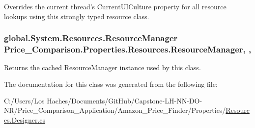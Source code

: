 Overrides the current thread's Current\-U\-I\-Culture property for all resource lookups using this strongly typed resource class. 

\hypertarget{class_price___comparison_1_1_properties_1_1_resources_ad35d3b18ae6e0e3f69519e1faf5e6526}{
\subsubsection[{Resource\-Manager}]{\setlength{\rightskip}{0pt plus 5cm}global.\-System.\-Resources.\-Resource\-Manager Price\-\_\-\-Comparison.\-Properties.\-Resources.\-Resource\-Manager\hspace{0.3cm}{\ttfamily [static]}, {\ttfamily [get]}, {\ttfamily [package]}}}\label{class_price___comparison_1_1_properties_1_1_resources_ad35d3b18ae6e0e3f69519e1faf5e6526}


Returns the cached Resource\-Manager instance used by this class. 



The documentation for this class was generated from the following file\-:\begin{DoxyCompactItemize}
\item 
C\-:/\-Users/\-Los Haches/\-Documents/\-Git\-Hub/\-Capstone-\/\-L\-H-\/\-N\-N-\/\-D\-O-\/\-N\-R/\-Price\-\_\-\-Comparison\-\_\-\-Application/\-Amazon\-\_\-\-Price\-\_\-\-Finder/\-Properties/\hyperlink{_resources_8_designer_8cs}{Resources.\-Designer.\-cs}\end{DoxyCompactItemize}
